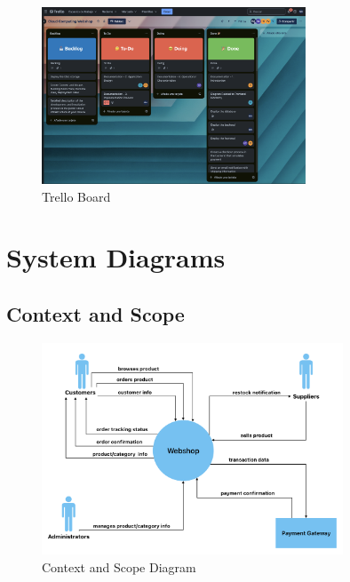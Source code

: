 \documentclass{llncs}
\begin{document}
\begin{figure}[H]
    \begin{center}
        \includegraphics[width=0.7\textwidth]{../diagrams/trello_board.png}
        \vspace{0.01\textwidth}
        \caption{Trello Board}
        \label{TrelloBoard} %
    \end{center}
\end{figure}
\section{System Diagrams}

\subsection{Context and Scope}
\begin{figure}[H]
    \begin{center}
        \includegraphics[width=0.8\textwidth]{../diagrams/contextview.png}
        \vspace{0.01\textwidth}
        \caption{Context and Scope Diagram}
        \label{ContextandScope} %
    \end{center}
\end{figure}
\end{document}
